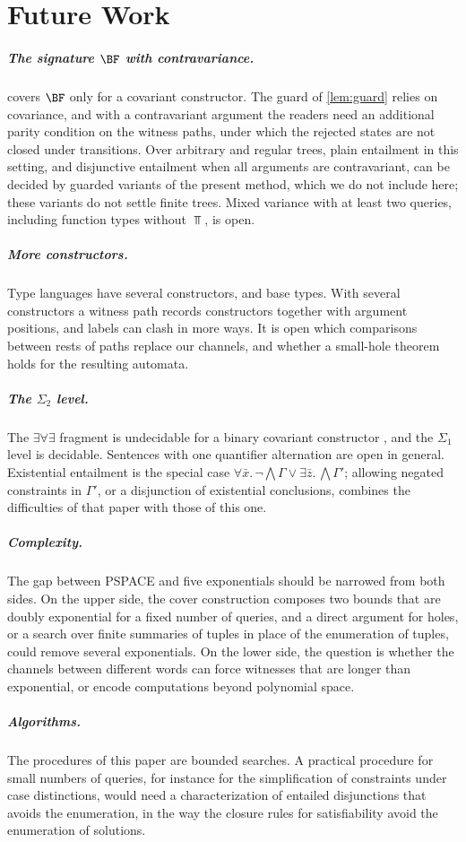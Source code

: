\section{Future Work}
\label{sec:future}

\subparagraph*{The signature $\BF$ with contravariance.}
 covers $\BF$ only for a covariant constructor. The guard
of \cref{lem:guard} relies on covariance, and with a contravariant argument
the readers need an additional parity condition on the witness paths, under
which the rejected states are not closed under transitions. Over arbitrary
and regular trees, plain entailment in this setting, and disjunctive
entailment when all arguments are contravariant, can be decided by guarded
variants of the present method, which we do not include here; these
variants do not settle finite trees. Mixed variance with at least two
queries, including function types without $\Top$, is open.

\subparagraph*{More constructors.}
Type languages have several constructors, and base types. With several
constructors a witness path records constructors together with argument
positions, and labels can clash in more ways. It is open which comparisons
between rests of paths replace our channels, and whether a small-hole
theorem holds for the resulting automata.

\subparagraph*{The $\Sigma_2$ level.}
The $\exists\forall\exists$ fragment is undecidable for a binary covariant
constructor \cite{Zhao26U}, and the $\Sigma_1$ level is decidable. Sentences with one quantifier alternation are open in
general. Existential entailment \cite{Zhao26E} is the special case
$\forall\bar x.\,\neg\bigwedge\Gamma\vee\exists\bar z.\,\bigwedge\Gamma'$;
allowing negated constraints in $\Gamma'$, or a disjunction of existential
conclusions, combines the difficulties of that paper with those of this one.

\subparagraph*{Complexity.}
The gap between PSPACE and five exponentials should be narrowed from both
sides. On the upper side, the cover construction composes two bounds that
are doubly exponential for a fixed number of queries, and a direct argument for holes, or a search over finite
summaries of tuples in place of the enumeration of tuples, could remove
several exponentials. On the lower side, the question is whether the
channels between different words can force witnesses that are longer than
exponential, or encode computations beyond polynomial space.

\subparagraph*{Algorithms.}
The procedures of this paper are bounded searches. A practical procedure
for small numbers of queries, for instance for the simplification of
constraints under case distinctions, would need a characterization of
entailed disjunctions that avoids the enumeration, in the way the closure
rules for satisfiability avoid the enumeration of solutions.
